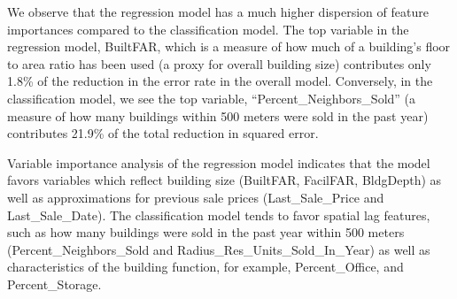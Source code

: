 \documentclass[conference,final,]{IEEEtran}
\begin{document}
\begin{table}

\caption{\label{tab:Class VarImp}\label{tab:ClassVarImp} Feature Importance of Top Performing Classification Model}
\centering
{}
\end{table}

We observe that the regression model has a much higher dispersion of
feature importances compared to the classification model. The top
variable in the regression model, BuiltFAR, which is a measure of how
much of a building's floor to area ratio has been used (a proxy for
overall building size) contributes only 1.8\% of the reduction in the
error rate in the overall model. Conversely, in the classification
model, we see the top variable, ``Percent\_Neighbors\_Sold'' (a measure
of how many buildings within 500 meters were sold in the past year)
contributes 21.9\% of the total reduction in squared error.

Variable importance analysis of the regression model indicates that the
model favors variables which reflect building size (BuiltFAR, FacilFAR,
BldgDepth) as well as approximations for previous sale prices
(Last\_Sale\_Price and Last\_Sale\_Date). The classification model tends
to favor spatial lag features, such as how many buildings were sold in
the past year within 500 meters (Percent\_Neighbors\_Sold and
Radius\_Res\_Units\_Sold\_In\_Year) as well as characteristics of the
building function, for example, Percent\_Office, and Percent\_Storage.
\end{document}
